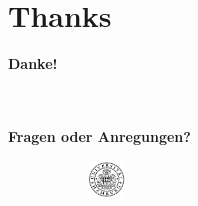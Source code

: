 
\section*{Thanks}
\begin{frame}
    
    \centering
    \vspace{2cm}
    
    \textbf{\Huge Danke!}
 
    \ \\
    \ \\
    \textbf{Fragen oder Anregungen?}
    
    
    \vspace{1.5cm}
    \begin{figure}
        \centering
        \begin{subfigure}{0.2\textwidth}
            \centering
            \includegraphics[height=1cm]{assets/img/uhh-gray.png}
        \end{subfigure}%
    \end{figure}
\end{frame}
